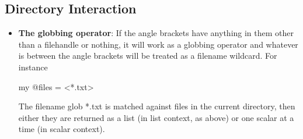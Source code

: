 \documentclass{report}
\begin{document}
    \subsection{Directory Interaction}
    \begin{itemize}
        \item \textbf{The globbing operator}: If the angle brackets have anything in them other than a filehandle or nothing, it will work as a globbing operator and whatever is between the angle brackets will be treated as a filename wildcard. For instance
            \bigbreak \noindent 
            \begin{perlcode}
            my @files = <*.txt>
            \end{perlcode}
            \bigbreak \noindent 
            The filename glob *.txt is matched against files in the current directory, then either they are returned as a list (in list context, as above) or one scalar at a time (in scalar context).
            \bigbreak \noindent 
\end{itemize}
\end{document}
